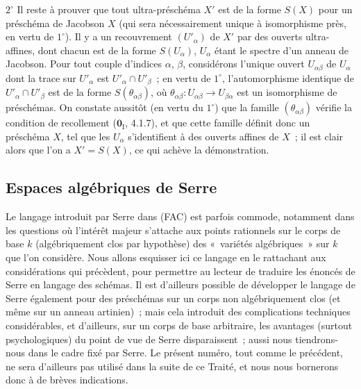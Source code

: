 $2^\circ$ Il reste à prouver que tout ultra-préschéma $X'$ est de la forme
$S(X)$ pour un préschéma de Jacobson $X$ (qui sera nécessairement unique à
isomorphisme près, en vertu de $1^\circ$). Il y a un recouvrement
$(U'_\alpha)$ de $X'$ par des ouverts ultra-affines, dont chacun est de la
forme $S(U_\alpha)$, $U_\alpha$ étant le spectre d'un anneau de Jacobson. Pour
tout couple d'indices $\alpha$, $\beta$, considérons l'unique ouvert
$U_{\alpha\beta}$ de $U_\alpha$ dont la trace sur $U'_\alpha$ est
$U'_\alpha\cap U'_\beta$~; en vertu de $1^\circ$, l'automorphisme identique de
$U'_\alpha\cap U'_\beta$ est de la forme $S(\theta_{\alpha\beta})$, où
$\theta_{\alpha\beta}:U_{\alpha\beta}\to U_{\beta\alpha}$ est un
isomorphisme de préschémas. On constate aussitôt (en vertu du $1^\circ$) que la
famille $(\theta_{\alpha\beta})$ vérifie la condition de recollement
($\mathbf 0_{\mathrm I}$, 4.1.7), et que cette famille définit donc un
préschéma $X$, tel que les $U_\alpha$ s'identifient à des ouverts affines de
$X$~; il est clair alors que l'on a $X'=S(X)$, ce qui achève la démonstration.

\subsection{Espaces algébriques de Serre}
\label{subsection:IV.10.10-fr}

\begin{env}[10.10.1]
\label{IV.10.10.1-fr}
Le langage introduit par Serre dans (FAC) est parfois commode, notamment dans
les questions où l'intérêt majeur s'attache aux points rationnels sur le corps
de base $k$ (algébriquement clos par hypothèse) des «~variétés algébriques~»
sur $k$ que l'on considère. Nous allons esquisser ici ce langage en le
rattachant aux considérations qui précèdent, pour permettre au lecteur de
traduire les énoncés de Serre en langage des schémas. Il est d'ailleurs
possible de développer le langage de Serre également pour des préschémas sur
un corps non algébriquement clos (et même sur un anneau artinien)~; mais cela
introduit des complications techniques considérables, et d'ailleurs, sur un
corps de base arbitraire, les avantages (surtout psychologiques) du point de
vue de Serre disparaissent~; aussi
nous tiendrons-nous dans le cadre fixé par Serre. Le présent numéro, tout comme
le précédent, ne sera d'ailleurs pas utilisé dans la suite de ce Traité, et
nous nous bornerons donc à de brèves indications.
\end{env}


